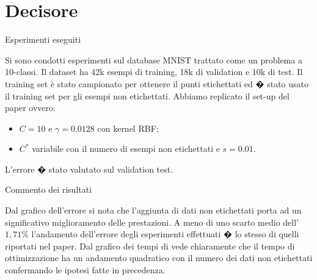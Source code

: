 \documentclass[mathserif]{beamer}
\begin{document}
\section{Decisore}

\begin{frame}{Esperimenti eseguiti}
\begin{block}{}
Si sono condotti esperimenti sul database MNIST trattato come un problema a 10-classi. Il dataset ha 42k esempi di training, 18k di validation e 10k di test. Il training set è stato campionato per ottenere il punti etichettati ed � stato usato il training set per gli esempi non etichettati. Abbiamo replicato il set-up del paper ovvero:
\begin{itemize}
	\item <1-> $C=10$ e $\gamma = 0.0128$ con kernel RBF;
	\item <1-> $C^*$ variabile con il numero di esempi non etichettati e $s=0.01$.
\end{itemize}
L'errore � stato valutato sul validation test.
\end{block}
\end{frame}

\begin{frame}
\end{frame}

\begin{frame}
\end{frame}


\begin{frame}{Commento dei risultati}
\begin{block}{}
Dal grafico dell'errore si nota che l'\alert{aggiunta di dati non etichettati porta ad un significativo miglioramento delle prestazioni}. A meno di uno scarto medio dell' $1,71\%$ l'andamento dell'errore degli esperimenti effettuati � lo stesso di quelli riportati nel paper. Dal grafico dei tempi di vede chiaramente che il tempo di ottimizzazione ha un andamento \alert{quadratico} con il numero dei dati non etichettati confermando le ipotesi fatte in precedenza.
\end{block}
\end{frame}
\end{document}
